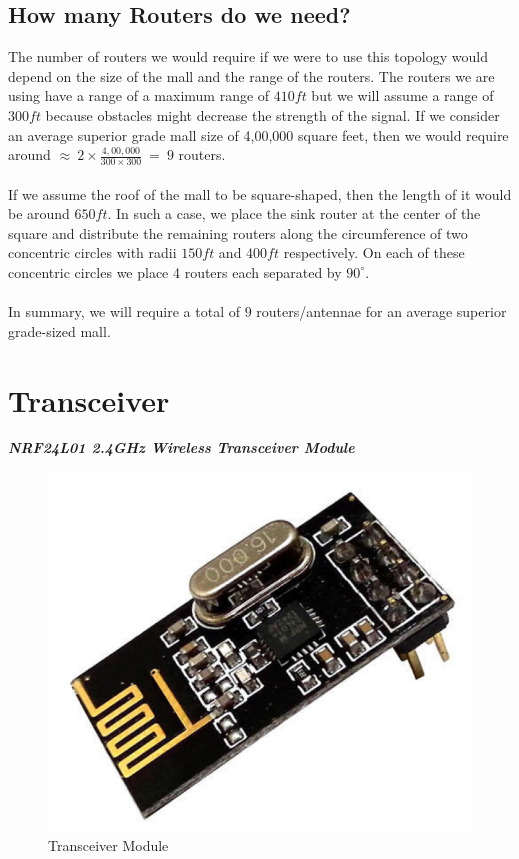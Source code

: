 \documentclass{article}
\begin{document}
\subsection{How many Routers do we need?}

The number of routers we would require if we were to use this topology would depend on the size of the mall and the range of the routers. The routers we are using have a range of a maximum range of $410ft$ but we will assume a range of $300ft$ because obstacles might decrease the strength of the signal. If we consider an average superior grade mall size of 4,00,000 square feet, then we would require around $\approx\ 2 \times \frac{4,00,000}{300 \times 300}\ =\ 9$ routers. 
\\ \\
If we assume the roof of the mall to be square-shaped, then the length of it would be around $650ft$. In such a case, we place the sink router at the center of the square and distribute the remaining routers along the circumference of two concentric circles with radii $150ft$ and $400ft$ respectively. On each of these concentric circles we place 4 routers each separated by $90^{\circ}$.
\\ \\
In summary, we will require a total of $9$ routers/antennae for an average superior grade-sized mall.

\section{Transceiver}
\textbf{\emph{NRF24L01 2.4GHz Wireless Transceiver Module}}
\begin{figure}[h]
    \centering
    \includegraphics[scale=0.5]{Images/Transceiver.png}
    \caption{Transceiver Module}
    \label{fig:my_label}
\end{figure}
\end{document}
